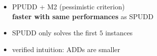 \documentclass[12pt,svgnames,table]{beamer}
\begin{document}
\begin{frame}
\begin{minipage}{0.45\linewidth}
\end{minipage}
\begin{alertblock}{}
\centering
\begin{itemize}
\item PPUDD + M2 (pessimistic criterion)\\ 
\textbf{faster with same performances} as SPUDD
\item SPUDD only solves the first $5$ instances
\item verified intuition: ADDs are smaller
\end{itemize}
\end{alertblock}
\end{frame}
\end{document}
